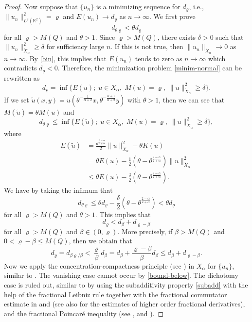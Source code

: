 \documentclass[10pt]{article}
\numberwithin{equation}{section}
\newcommand{\lt}{{L^2(\mathbb{R}^2)}}
\newcommand{\xx}{{\dot{X}_\alpha}}
\newcommand{\al}{\alpha}
\begin{document}
\begin{proof}
		Now suppose that $\{u_n\}$ is a minimizing sequence for $d_\varrho$, i.e., $\|u_n\|_\lt^2=\varrho$ and $E(u_n)\to d_\varrho$ as $n\to\infty$. We first prove
		\begin{equation}
			d_{\theta\varrho}<\theta d_\varrho
		\end{equation}
		for all $\varrho>M(Q)$ and $\theta>1$.  Since $\varrho>M(Q)$, there exists $\delta>0$ such that $\|u_n\|_\xx^2\geq\delta$ for sufficiency large $n$. If this is not true, then $\|u_n\|_\xx\to0$ as $n\to\infty$. By \eqref{bin}, this implies that $E(u_n)$ tends to zero as $n\to\infty$ which contradicts $d_\varrho<0$. Therefore, the minimization problem \eqref{minim-normal} can be rewritten as
		\begin{equation}\label{min-upb}
			d_\varrho=\inf\{E(u);\; u\in X_\al,\; M(u)=\varrho,\;\|u\|_\xx^2\geq\delta\}.
		\end{equation}
		If we set $\tilde{u}(x,y)=u(\theta^{-\frac{1}{\al+2}}x,\theta^{-\frac{\al+1}{\al+2}}y)$ with $\theta>1$, then we can see that $M(\tilde{u})=\theta M(u)$ and
		\begin{equation}
			d_{\theta\varrho}\leq\inf\{E(\tilde{u});\; u\in X_\al,\;M(u)=\varrho,\;\|u\|_\xx^2\geq\delta\},
		\end{equation}
		where
		\[
		\begin{split}
			E(\tilde{u})&=
			\frac{\theta^{\frac{2-\al}{2+\al}}}{2}\|u\|_\xx^2-\theta K(u)\\
			&=\theta E(u)-\frac{1}{2}(\theta-\theta^{\frac{2-\al}{2+\al}})\|u\|_\xx^2\\
			&\leq\theta E(u)-\frac{\delta}{2}(\theta-\theta^{\frac{2-\al}{2+\al}}).
		\end{split}
		\]
		We have by taking the infimum that
		\[
		d_{\theta\varrho}\leq \theta d_\varrho-\frac{\delta}{2}(\theta-\theta^{\frac{2-\al}{2+\al}})<\theta d_\varrho
		\]
		for all $\varrho>M(Q)$ and $\theta>1$. This implies that
		\begin{equation}\label{subadd}
			d_\varrho<d_\beta +d_{\varrho-\beta}
		\end{equation}
		for all $\varrho>M(Q)$ and $\beta\in(0,\varrho)$. More precisely, if $\beta>M(Q)$ and $0<\varrho-\beta\leq M(Q)$, then we  obtain that
		\[
		d_\varrho=d_{\beta\varrho/\beta}<\frac\varrho\beta d_\beta=d_\beta+\frac{\varrho-\beta}{\beta}d_\beta\leq d_\beta+d_{\varrho-\beta}.
		\]
		Now we apply the concentration-compactness principle (see \cite{Li1}) in $X_\al$ for $\{u_n\}$, similar to \cite{dbs-0,dbs-1,AMC,lps-0}. The vanishing case cannot occur by \eqref{bound-below}. The dichotomy case is ruled out, similar to \cite{dbs-1} by using the subadditivity property \eqref{subadd} with the help of the fractional Leibniz rule together with the fractional commutator estimate in \cite[Lemma 2.5]{gh} and \cite[Lemma 2.12]{zeng} (see also \cite{li} for the estimates of higher order fractional derivatives), and the fractional Poincar\'{e} inequality (see \cite[Proposition 2.1]{dd}, \cite[Lemma 2.2]{hv} and \cite{bucur,lnp}). 

\end{proof}
\end{document}
